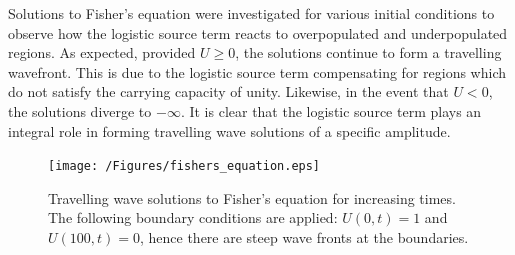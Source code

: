 \documentclass[11pt,a4paper]{article}
\begin{document}
		Solutions to Fisher's equation were investigated for various initial conditions to observe how the logistic source term reacts to overpopulated and underpopulated regions. As expected, provided $U \ge 0$, the solutions continue to form a travelling wavefront. This is due to the logistic source term compensating for regions which do not satisfy the carrying capacity of unity. Likewise, in the event that $U < 0$, the solutions diverge to $-\infty$. It is clear that the logistic source term plays an integral role in forming travelling wave solutions of a specific amplitude.

		\begin{figure}[tbh]
			\centering
				\texttt{[image: /Figures/fishers\_equation.eps]}
			\caption{Travelling wave solutions to Fisher's equation for increasing times. The following boundary conditions are applied: $U(0, t) = 1$ and $U(100, t) = 0$, hence there are steep wave fronts at the boundaries.}
			\label{fig:fishers_equation_sol_pdepe}
		\end{figure}
	



\clearpage
\printbibliography
\end{document}
